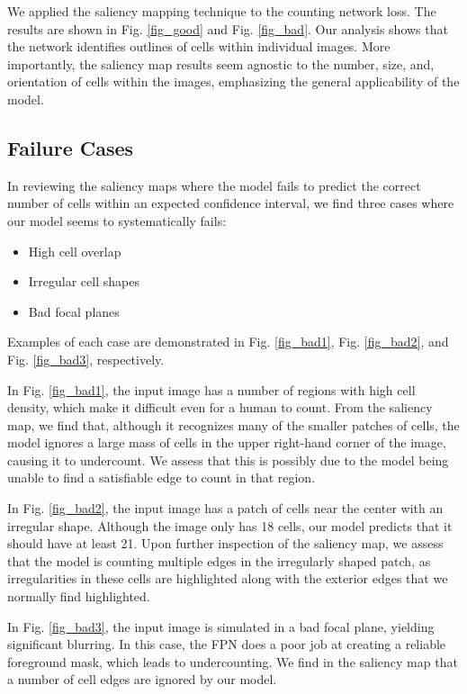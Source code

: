 \documentclass[10pt,twocolumn,letterpaper]{article}
\begin{document}
We applied the saliency mapping technique to the counting network loss. The results are shown in Fig. \ref{fig_good} and Fig. \ref{fig_bad}. Our analysis shows that the network identifies outlines of cells within individual images. More importantly, the saliency map results seem agnostic to the number, size, and, orientation of cells within the images, emphasizing the general applicability of the model. 


\subsection{Failure Cases}

In reviewing the saliency maps where the model fails to predict the correct number of cells within an expected confidence interval, we find three cases where our model seems to systematically fails:

\begin{itemize}\itemsep=1pt
\item High cell overlap
\item Irregular cell shapes 
\item Bad focal planes
\end{itemize}

Examples of each case are demonstrated in Fig. \ref{fig_bad1}, Fig. \ref{fig_bad2}, and Fig. \ref{fig_bad3}, respectively.

In Fig. \ref{fig_bad1}, the input image has a number of regions with high cell density, which make it difficult even for a human to count. From the saliency map, we find that, although it recognizes many of the smaller patches of cells, the model ignores a large mass of cells in the upper right-hand corner of the image, causing it to undercount. We assess that this is possibly due to the model being unable to find a satisfiable edge to count in that region.

In Fig. \ref{fig_bad2}, the input image has a patch of cells near the center with an irregular shape. Although the image only has 18 cells, our model predicts that it should have at least 21. Upon further inspection of the saliency map, we assess that the model is counting multiple edges in the irregularly shaped patch, as irregularities in these cells are highlighted along with the exterior edges that we normally find highlighted.

In Fig. \ref{fig_bad3}, the input image is simulated in a bad focal plane, yielding significant blurring. In this case, the FPN does a poor job at creating a reliable foreground mask, which leads to undercounting. We find in the saliency map that a number of cell edges are ignored by our model.
\end{document}
